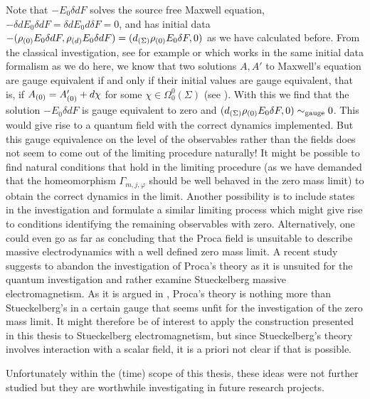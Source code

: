 Note that $-E_0 \delta dF$ solves the source free Maxwell equation, $-\delta d E_0 \delta d F = \delta d  E_0 d \delta F = 0$, and has initial data $-(\rho_{(0)} E_0 \delta d F, \rho_{(d)} E_0 \delta d F) =  (d_{(\Sigma)} \rho_{(0)} E_0  \delta F, 0)$ as we have calculated before. From the classical investigation, see for example \cite{Sanders} or \cite{pfenning} which works in the same initial data formalism as we do here, we know that two solutions $A, A'$ to Maxwell's equation are gauge equivalent if and only if their initial values are gauge equivalent, that is, if  ${A_{(0)}} = {A'_{(0)}} + d\chi$ for some $\chi \in \Omega^0_0(\Sigma)$ (see \cite[Proposition 2.13]{pfenning}). With this we find that the solution $-E_0 \delta dF$ is gauge equivalent to zero and $(d_{(\Sigma)} \rho_{(0)} E_0  \delta F, 0) \sim_\text{gauge} 0$. This would give rise to a quantum field with the correct dynamics implemented. But this gauge equivalence on the level of the observables rather than the fields does not seem to come out of the limiting procedure naturally! It might be possible to find natural conditions that hold in the limiting procedure (as we have demanded that the homeomorphism $\Gamma_{m,j,\varphi}$ should be well behaved in the zero mass limit) to obtain the correct dynamics in the limit. Another possibility is to include states in the investigation and formulate a similar limiting process which might give rise to conditions identifying the remaining observables with zero. Alternatively, one could even go as far as concluding that the Proca field is unsuitable to describe massive electrodynamics with a well defined zero mass limit. A recent study \cite{stueckelberg_curvedST} suggests to abandon the investigation of Proca's theory as it is unsuited for the quantum investigation and rather examine Stueckelberg massive electromagnetism. As it is argued in \cite{stueckelberg_curvedST}, Proca's theory is nothing more than Stueckelberg's in a certain gauge that seems unfit for the investigation of the zero mass limit. It might therefore be of interest to apply the construction presented in this thesis to Stueckelberg electromagnetism, but since Stueckelberg's theory involves interaction with a scalar field, it is a priori not clear if that is possible.\par
Unfortunately within the (time) scope of this thesis, these ideas were not further studied but they are worthwhile investigating in future research projects.
%
